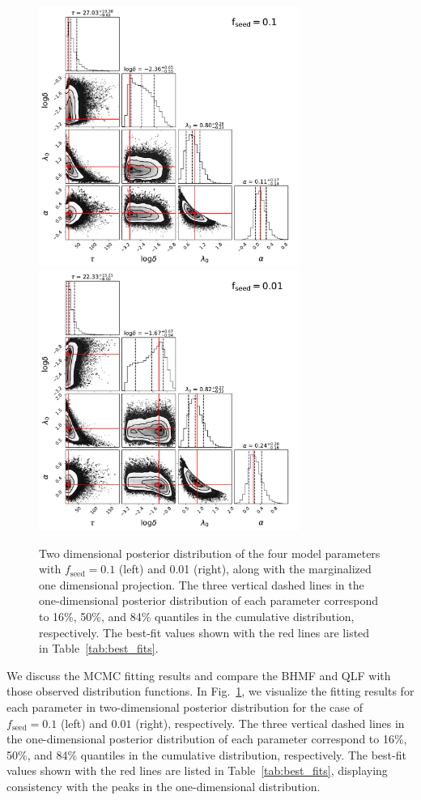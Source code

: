 \documentclass[twocolumn, twocolappendix]{aastex63}
\newcommand{\fseed}{f_\mathrm{seed}}
\begin{document}
\begin{CJK*}{UTF8}{gbsn}
\begin{figure}
\centering
\includegraphics[width=85mm]{f1_corner.pdf}\hspace{3mm}
\includegraphics[width=85mm]{f2_corner.pdf}
\caption{
Two dimensional posterior distribution of the four model parameters with $\fseed=0.1$ (left) and 0.01 (right), 
along with the marginalized one dimensional projection.
The three vertical dashed lines in the one-dimensional posterior distribution of each parameter correspond to 
16\%, 50\%, and 84\% quantiles in the cumulative distribution, respectively. 
The best-fit values shown with the red lines are listed in Table~\ref{tab:best_fits}.
}
\label{fig:contour}
\vspace{5mm}
\end{figure}
%


We discuss the MCMC fitting results and compare the BHMF and QLF with those observed distribution functions.
In Fig.~\ref{fig:contour}, we visualize the fitting results for each parameter in two-dimensional 
posterior distribution for the case of $\fseed= 0.1$ (left) and $0.01$ (right), respectively.
The three vertical dashed lines in the one-dimensional posterior distribution of each parameter
correspond to 16\%, 50\%, and 84\% quantiles in the cumulative distribution, respectively.
The best-fit values shown with the red lines are listed in Table~\ref{tab:best_fits},
displaying consistency with the peaks in the one-dimensional distribution.



\end{CJK*}
\end{document}
